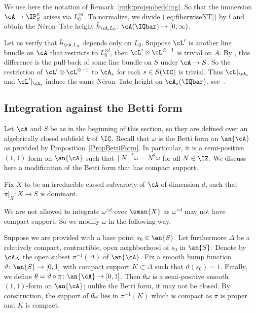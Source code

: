 \begin{remark}
\notready\label{RemarkHtcompatible}
  We use here the notation of Remark~\ref{rmk:projembedding}.
  So that the immersion $\cA\rightarrow \IP^n_S$ arises via
  $L_0^{\otimes l}$. To normalize,
  we divide (\ref{eq:fiberwiseNT}) by $l$ and obtain the
  N\'eron--Tate height $\hat h_{\cA,L_0}\colon \cA(\IQbar)\rightarrow
  [0,\infty)$.

  Let us verify that $\hat h_{\cA,L_0}$ depends only on $L_0$. Suppose
  $\cL'$ is another line bundle on $\cA$ that restricts to
  $L_0^{\otimes l}$,
  then $\cL'\otimes\cL^{\otimes -1}$ is trivial on $A$. By \cite[Corollaire~21.4.13 (pp.~361 of EGA IV-4, in Errata et Addenda, liste~3)]{EGAIV}, this difference is the pull-back of some line
  bundle on $S$ under $\cA\rightarrow S$. So the restriction of
  $\cL'\otimes\cL^{\otimes -1}$ to $\cA_s$ for each $s\in S(\IC)$ is
  trivial. Thus $\cL|_{\cA_s}$ and $\cL'|_{\cA_s}$ induce the same N\'eron--Tate
  height on $\cA_s(\IQbar)$, see~\cite[$\mathsection$9.2]{BG}.
\end{remark}

\subsection{Integration against the Betti form}\label{SubsectionSetUpHtIneqBetti}
Let $\cA$  and $S$ be as in the beginning of this section, so they are
defined over an algebrically closed subfield $k$ of $\IC$.
Recall that $\omega$ is the Betti form on $\an{\cA}$ as provided by
Proposition~\ref{PropBettiForm}. In particular, it is a
semi-positive $(1,1)$-form on $\an{\cA}$ such that $[N]^*\omega =
N^2 \omega$ for all $N\in\IZ$. We discuss here a modification of  the
Betti form that has compact support.

Fix $X$ to be an irreducible closed subvariety of $\cA$ of dimension $d$, such that $\pi|_X \colon X \rightarrow S$ is dominant.

We are not allowed to integrate $\omega^{\wedge d}$ over $\sman{X}$ as $\omega^{\wedge d}$ may not have compact support. So we modify $\omega$ in the following way.

Suppose we are provided with a base point $s_0 \in \an{S}$. Let
furthermore $\Delta$ be a relatively compact, contractible,
open neighborhood of $s_0$ in $\an{S}$. Denote by $\cA_{\Delta}$ the open
subset $\pi^{-1}(\Delta)$ of $\an{\cA}$. Fix a smooth bump function $\vartheta \colon \an{S}\rightarrow [0,1]$ with compact support $K \subset \Delta$ such that $\vartheta(s_0)=1$. Finally, we define $\theta = \vartheta\circ\pi \colon \an{\cA} \rightarrow [0,1]$.
Then $\theta\omega$ is a semi-positive smooth $(1,1)$-form on $\an{\cA}$;
unlike the Betti form, it may not be closed. By construction, the support
of $\theta\omega$ lies in $\pi^{-1}(K)$ which is compact as $\pi$ is proper and $K$ is compact.

